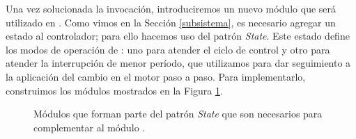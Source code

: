 Una vez solucionada la invocación, introduciremos un nuevo módulo que será utilizado en \RotorCtrl. Como vimos en la Sección \ref{subsistema}, es necesario agregar un estado al controlador; para ello hacemos uso del patrón \textit{State}. Este estado define los modos de operación de \RotorCtrl: uno para atender el ciclo de control y otro para atender la interrupción de menor período, que utilizamos para dar seguimiento a la aplicación del cambio en el motor paso a paso. Para implementarlo, construimos los módulos mostrados en la Figura \ref{operationState}.

\begin{figure}[H]
\caption{Módulos que forman parte del patrón \textit{State} que son necesarios para complementar al módulo \RotorCtrl.}
\label{operationState}
\begin{center}
\end{center}
\end{figure}

